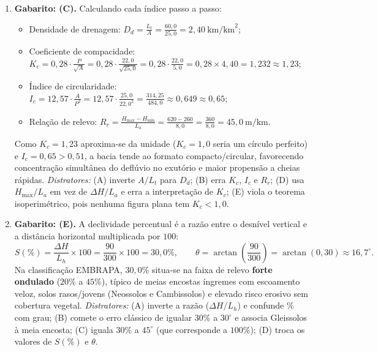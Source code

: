 \begin{boxGabarito}
\begin{enumerate}[leftmargin=1.8em, itemsep=5pt]
  \item \textbf{Gabarito: (C).} Calculando cada índice passo a passo:
  \begin{itemize}[leftmargin=1.4em, itemsep=1pt, topsep=2pt]
    \item Densidade de drenagem: $D_d = \frac{L_t}{A} = \frac{60,0}{25,0} = 2,40\ \text{km/km}^2$;
    \item Coeficiente de compacidade: $K_c = 0,28 \cdot \frac{P}{\sqrt{A}} = 0,28 \cdot \frac{22,0}{\sqrt{25,0}} = 0,28 \cdot \frac{22,0}{5,0} = 0,28 \times 4,40 = 1,232 \approx 1,23$;
    \item Índice de circularidade: $I_c = 12,57 \cdot \frac{A}{P^2} = 12,57 \cdot \frac{25,0}{22,0^2} = \frac{314,25}{484,0} \approx 0,649 \approx 0,65$;
    \item Relação de relevo: $R_r = \frac{H_{\max} - H_{\min}}{L_a} = \frac{620 - 260}{8,0} = \frac{360}{8,0} = 45,0\ \text{m/km}$.
  \end{itemize}
  Como $K_c = 1,23$ aproxima-se da unidade ($K_c = 1,0$ seria um círculo perfeito) e $I_c = 0,65 > 0,51$, a bacia tende ao formato compacto/circular, favorecendo concentração simultânea do deflúvio no exutório e maior propensão a cheias rápidas. \textit{Distratores:} (A) inverte $A/L_t$ para $D_d$; (B) erra $K_c$, $I_c$ e $R_r$; (D) usa $H_{\max}/L_a$ em vez de $\Delta H/L_a$ e erra a interpretação de $K_c$; (E) viola o teorema isoperimétrico, pois nenhuma figura plana tem $K_c < 1,0$.

  \item \textbf{Gabarito: (E).} A declividade percentual é a razão entre o desnível vertical e a distância horizontal multiplicada por $100$:
  \[
    S(\%) = \frac{\Delta H}{L_h}\times 100 = \frac{90}{300}\times 100 = 30,0\%, \qquad
    \theta = \arctan\!\left(\frac{90}{300}\right) = \arctan(0,30) \approx 16,7^\circ.
  \]
  Na classificação EMBRAPA, $30,0\%$ situa-se na faixa de relevo \textbf{forte ondulado} ($20\%$ a $45\%$), típico de meias encostas íngremes com escoamento veloz, solos rasos/jovens (Neossolos e Cambissolos) e elevado risco erosivo sem cobertura vegetal. \textit{Distratores:} (A) inverte a razão ($\Delta H/L_h$) e confunde $\%$ com grau; (B) comete o erro clássico de igualar $30\%$ a $30^\circ$ e associa Gleissolos à meia encosta; (C) iguala $30\%$ a $45^\circ$ (que corresponde a $100\%$); (D) troca os valores de $S(\%)$ e $\theta$.


\end{enumerate}
\end{boxGabarito}

